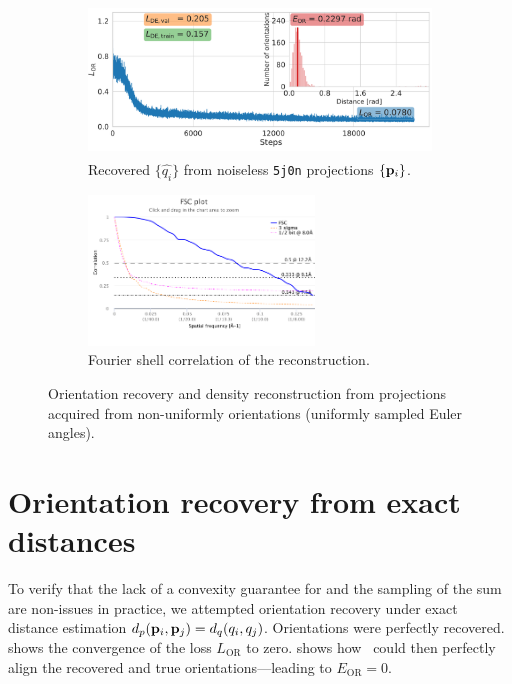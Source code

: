 \begin{figure}[ht!]
    \centering
    \begin{subfigure}[b]{0.60\linewidth}
        \centering
        \includegraphics[height=4cm]{figures/5j0n_ar_aa_fullcvg.pdf}
        \caption{Recovered $\{ \widehat{q_i} \}$ from noiseless \texttt{5j0n} projections $\{ \mathbf{p}_i \}$.}
    \end{subfigure}
    \hfill
    \begin{subfigure}[b]{0.38\linewidth}
        \centering
        \includegraphics[height=4cm]{figures/FSC_5j0n_fullcvg_noise0_fin_vs_init.pdf}
        \caption{Fourier shell correlation of the reconstruction.}
    \end{subfigure}
    \caption{%
        Orientation recovery and density reconstruction from projections acquired from non-uniformly orientations (uniformly sampled Euler angles).
    }\label{fig:recovery-nonuniform}
\end{figure}

\section{Orientation recovery from exact distances}\label{apx:results:orientation-recovery:exact}


To verify that the lack of a convexity guarantee for  and the sampling of the sum are non-issues in practice, we attempted orientation recovery under exact distance estimation $d_p(\mathbf{p}_i, \mathbf{p}_j) = d_q(q_i, q_j)$.
Orientations were perfectly recovered.
 shows the convergence of the loss $L_\text{OR}$ to zero.
 shows how~ could then perfectly align the recovered and true orientations---leading to $E_\text{OR} = 0$.

